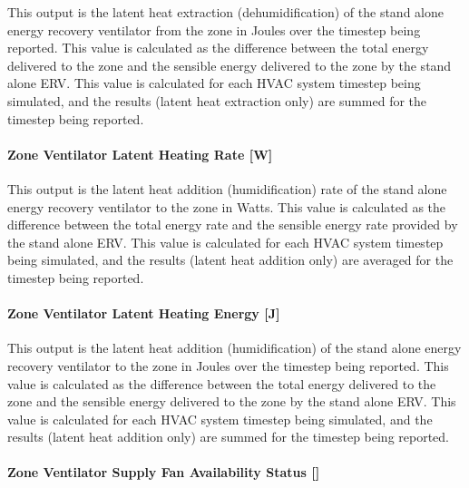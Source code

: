 This output is the latent heat extraction (dehumidification) of the stand alone energy recovery ventilator from the zone in Joules over the timestep being reported. This value is calculated as the difference between the total energy delivered to the zone and the sensible energy delivered to the zone by the stand alone ERV. This value is calculated for each HVAC system timestep being simulated, and the results (latent heat extraction only) are summed for the timestep being reported.

\paragraph{Zone Ventilator Latent Heating Rate {[}W{]}}\label{zone-ventilator-latent-heating-rate-w}

This output is the latent heat addition (humidification) rate of the stand alone energy recovery ventilator to the zone in Watts. This value is calculated as the difference between the total energy rate and the sensible energy rate provided by the stand alone ERV. This value is calculated for each HVAC system timestep being simulated, and the results (latent heat addition only) are averaged for the timestep being reported.

\paragraph{Zone Ventilator Latent Heating Energy {[}J{]}}\label{zone-ventilator-latent-heating-energy-j}

This output is the latent heat addition (humidification) of the stand alone energy recovery ventilator to the zone in Joules over the timestep being reported. This value is calculated as the difference between the total energy delivered to the zone and the sensible energy delivered to the zone by the stand alone ERV. This value is calculated for each HVAC system timestep being simulated, and the results (latent heat addition only) are summed for the timestep being reported.

\paragraph{Zone Ventilator Supply Fan Availability Status {[]}}\label{zone-ventilator-supply-fan-availability-status}

